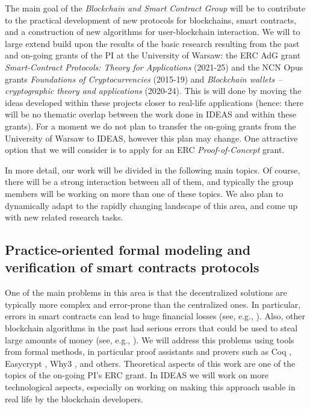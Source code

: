 \documentclass{article}
\begin{document}
The main goal of the \emph{Blockchain and Smart Contract Group} will be to contribute to the practical development of new protocols for blockchains, smart contracts, and a construction of new algorithms for user-blockchain interaction. 
We will to large extend build upon the results of the basic research resulting from the past and on-going grants of the PI at the University of Warsaw: the ERC AdG grant \emph{Smart-Contract Protocols: Theory for Applications} (2021-25) and the NCN Opus grants \emph{Foundations of Cryptocurrencies} (2015-19) and \emph{Blockchain wallets -- cryptographic theory and applications} (2020-24). This is will done by moving the ideas developed within these projects closer to real-life applications (hence: there will be no thematic overlap between the work done in IDEAS and within these grants). For a moment we do not plan to transfer the on-going grants from the University of Warsaw to IDEAS, however this plan may change. One attractive option that we will consider is to apply for an ERC \emph{Proof-of-Concept} grant.

In more detail, our work will be divided in the following main topics. Of course, there will be a strong interaction between all of them, and typically the group members will be working on more than one of these topics. We also plan to dynamically adapt to the rapidly changing landscape of this area, and come up with new related research tasks.




\subsection{Practice-oriented formal modeling and verification of smart contracts protocols}\label{sec:verif}

One of the main problems in this area is that the decentralized solutions are typically more complex and error-prone than the centralized ones. In particular, errors in smart contracts can lead to huge financial losses (see, e.g., \cite{DAO}). Also, other blockchain algorithms in the past had serious errors that could be used to steal large amounts of money (see, e.g., \cite{HACKETT}).  We will address this problems using tools from formal methods, in particular proof assistants and provers such as Coq \cite{Chlipala2013}, Easycrypt \cite{Barthe2013}, Why3 \cite{Santos2015}, and others. Theoretical aspects of this work are one of the topics of the on-going PI's ERC grant. In IDEAS we will work on more technological aspects, especially on working on making this approach usable in real life by the blockchain developers.
\end{document}
